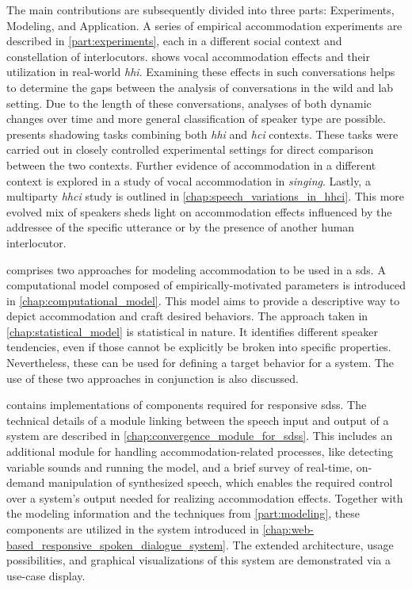 The main contributions are subsequently divided into three parts: Experiments, Modeling, and Application.
A series of empirical accommodation experiments are described in \cref{part:experiments}, each in a different social context and constellation of interlocutors.
 shows vocal accommodation effects and their utilization in real-world \emph{\acl{hhi}}.
Examining these effects in such conversations helps to determine the gaps between the analysis of conversations in the wild and lab setting.
Due to the length of these conversations, analyses of both dynamic changes over time and more general classification of speaker type are possible.
 presents shadowing tasks combining both \emph{\acl{hhi}} and \emph{\acl{hci}} contexts.
These tasks were carried out in closely controlled experimental settings for direct comparison between the two contexts.
Further evidence of accommodation in a different context is explored in a study of vocal accommodation in \emph{singing}. 
Lastly, a multiparty \emph{\acl{hhci}} study is outlined in \cref{chap:speech_variations_in_hhci}.
This more evolved mix of speakers sheds light on accommodation effects influenced by the addressee of the specific utterance or by the presence of another human interlocutor.

 comprises two approaches for modeling accommodation to be used in a \acl{sds}.
A computational model composed of empirically-motivated parameters is introduced in \cref{chap:computational_model}.
This model aims to provide a descriptive way to depict accommodation and craft desired behaviors.
The approach taken in \cref{chap:statistical_model} is statistical in nature.
It identifies different speaker tendencies, even if those cannot be explicitly be broken into specific properties.
Nevertheless, these can be used for defining a target behavior for a system.
The use of these two approaches in conjunction is also discussed.

 contains implementations of components required for responsive \aclp{sds}.
The technical details of a module linking between the speech input and output of a system are described in \cref{chap:convergence_module_for_sdss}.
This includes an additional module for handling accommodation-related processes, like detecting variable sounds and running the model, and a brief survey of real-time, on-demand manipulation of synthesized speech, which enables the required control over a system's output needed for realizing accommodation effects.
Together with the modeling information and the techniques from \cref{part:modeling}, these components are utilized in the system introduced in \cref{chap:web-based_responsive_spoken_dialogue_system}.
The extended architecture, usage possibilities, and graphical visualizations of this system are demonstrated via a use-case display.

